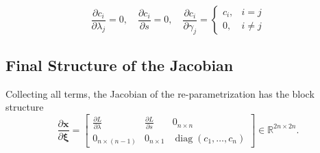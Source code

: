 \begin{equation*}
\frac{\partial c_i}{\partial \lambda_j} =0, \quad
\frac{\partial c_i}{\partial s} = 0,\quad
\frac{\partial c_i}{\partial \gamma_j}
=
\begin{cases}
c_i, & i=j\\[4pt]
0, & i\neq j
\end{cases}
\end{equation*}

\subsection*{Final Structure of the Jacobian}

Collecting all terms, the Jacobian of the re-parametrization has the block structure
\begin{equation*}
\frac{\partial \mathbf{x}}{\partial \bm{\xi}}
=
\begin{bmatrix}
\displaystyle \frac{\partial L}{\partial \lambda} &
\displaystyle \frac{\partial L}{\partial s} &
0_{n\times n}
\\[8pt]
0_{n\times (n-1)} &
0_{n\times 1} &
\operatorname{diag}(c_1,\dots,c_n)
\end{bmatrix} \in \mathbb{R}^{2n\times 2n}.
\end{equation*}